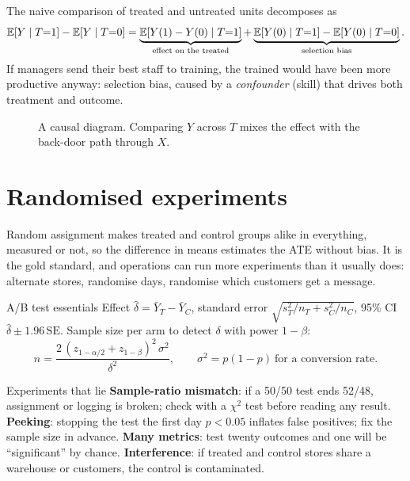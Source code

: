 The naive comparison of treated and untreated units decomposes as
\[ \mathbb{E}[Y\mid T{=}1]-\mathbb{E}[Y\mid T{=}0]=\underbrace{\mathbb{E}[Y(1)-Y(0)\mid T{=}1]}_{\text{effect on the treated}}
+\underbrace{\mathbb{E}[Y(0)\mid T{=}1]-\mathbb{E}[Y(0)\mid T{=}0]}_{\text{selection bias}}. \]
If managers send their best staff to training, the trained would have been more productive anyway: selection bias,
caused by a \emph{confounder} (skill) that drives both treatment and outcome.

\begin{figure}[H]
\centering
{}
\caption{A causal diagram. Comparing $Y$ across $T$ mixes the effect with the back-door path through $X$.}
\end{figure}

\section{Randomised experiments}
Random assignment makes treated and control groups alike in everything, measured or not, so the difference in means
estimates the ATE without bias. It is the gold standard, and operations can run more experiments than it usually does:
alternate stores, randomise days, randomise which customers get a message.

\begin{keyformula}{A/B test essentials}
Effect $\hat\delta=\bar Y_T-\bar Y_C$, standard error $\sqrt{s_T^2/n_T+s_C^2/n_C}$, 95\% CI $\hat\delta\pm1.96\,\mathrm{SE}$.
Sample size per arm to detect $\delta$ with power $1-\beta$:
\[ n=\frac{2\,(z_{1-\alpha/2}+z_{1-\beta})^2\,\sigma^2}{\delta^2},\qquad \sigma^2=p(1-p)\ \text{for a conversion rate}. \]
\end{keyformula}

\begin{pitfall}{Experiments that lie}
\textbf{Sample-ratio mismatch}: if a 50/50 test ends 52/48, assignment or logging is broken; check with a $\chi^2$ test
before reading any result. \textbf{Peeking}: stopping the test the first day $p<0.05$ inflates false positives;
fix the sample size in advance. \textbf{Many metrics}: test twenty outcomes and one will be ``significant'' by chance.
\textbf{Interference}: if treated and control stores share a warehouse or customers, the control is contaminated.
\end{pitfall}

